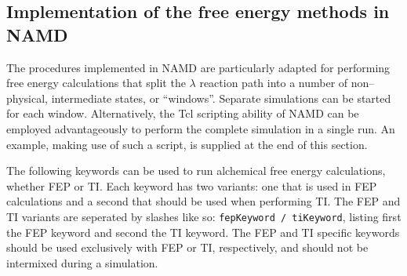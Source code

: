 \subsection{Implementation of the free energy methods in NAMD}
\label{section:fepparameters}


The procedures implemented in NAMD are particularly
adapted for performing free
energy calculations that split the $\lambda$
reaction path into a number of non--physical,
intermediate states, or ``windows''. Separate simulations
can be started for each window.
Alternatively, the {\sc Tcl} scripting ability of
NAMD can be employed advantageously
to perform the complete simulation in a single run.
An example, making use of such a script, is supplied at the end
of this section.

The following keywords can be used to run alchemical free
energy calculations, whether FEP or TI.  Each keyword has two variants: one that is used in FEP calculations and a second that should be used when performing TI.  The FEP and TI variants are seperated by slashes like so: {\tt fepKeyword / tiKeyword}, listing first the FEP keyword and second the TI keyword. The FEP and TI specific keywords should be used exclusively with FEP or TI, respectively, and should not be intermixed during a simulation. 

